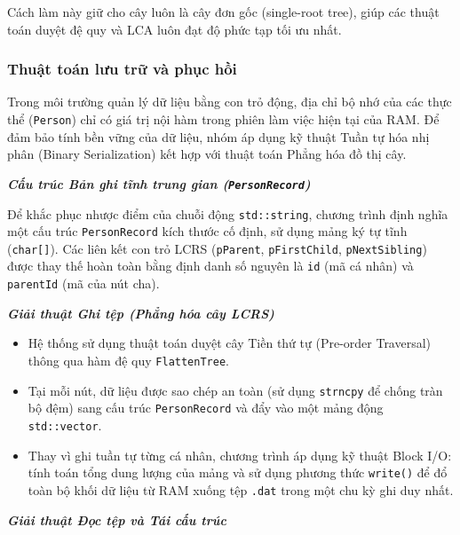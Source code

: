 Cách làm này giữ cho cây luôn là cây đơn gốc (single-root tree), giúp các thuật toán duyệt đệ quy và LCA luôn đạt độ phức tạp tối ưu nhất.

\subsubsection{Thuật toán lưu trữ và phục hồi}

Trong môi trường quản lý dữ liệu bằng con trỏ động, địa chỉ bộ nhớ của các thực thể (\texttt{Person}) chỉ có giá trị nội hàm trong phiên làm việc hiện tại của RAM. Để đảm bảo tính bền vững của dữ liệu, nhóm áp dụng kỹ thuật Tuần tự hóa nhị phân (Binary Serialization) kết hợp với thuật toán Phẳng hóa đồ thị cây.

\textbf{\textit{Cấu trúc Bản ghi tĩnh trung gian (\texttt{PersonRecord})}}

Để khắc phục nhược điểm của chuỗi động \texttt{std::string}, chương trình định nghĩa một cấu trúc \texttt{PersonRecord} kích thước cố định, sử dụng mảng ký tự tĩnh (\texttt{char[]}). Các liên kết con trỏ LCRS (\texttt{pParent}, \texttt{pFirstChild}, \texttt{pNextSibling}) được thay thế hoàn toàn bằng định danh số nguyên là \texttt{id} (mã cá nhân) và \texttt{parentId} (mã của nút cha).

\textbf{\textit{Giải thuật Ghi tệp (Phẳng hóa cây LCRS)}}
\begin{itemize}
	\item Hệ thống sử dụng thuật toán duyệt cây Tiền thứ tự (Pre-order Traversal) thông qua hàm đệ quy \texttt{FlattenTree}.
	\item Tại mỗi nút, dữ liệu được sao chép an toàn (sử dụng \texttt{strncpy} để chống tràn bộ đệm) sang cấu trúc \texttt{PersonRecord} và đẩy vào một mảng động \texttt{std::vector}.
	\item Thay vì ghi tuần tự từng cá nhân, chương trình áp dụng kỹ thuật Block I/O: tính toán tổng dung lượng của mảng và sử dụng phương thức \texttt{write()} để đổ toàn bộ khối dữ liệu từ RAM xuống tệp \texttt{.dat} trong một chu kỳ ghi duy nhất.
\end{itemize}



\textbf{\textit{Giải thuật Đọc tệp và Tái cấu trúc}}

